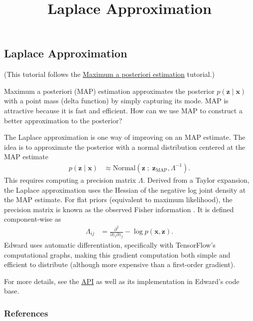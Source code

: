 \title{Laplace Approximation}

\subsection{Laplace Approximation}

(This tutorial follows the
\href{/tutorials/map}{Maximum a posteriori estimation} tutorial.)

Maximum a posteriori (MAP) estimation approximates the posterior $p(\mathbf{z} \mid \mathbf{x})$
with a point mass (delta function) by simply capturing its mode. MAP is
attractive because it is fast and efficient. How can we use MAP to construct a
better approximation to the posterior?

The Laplace approximation
\citep{laplace1986memoir}
is one way of improving on an MAP estimate. The idea
is to approximate the posterior with a normal distribution centered at the MAP
estimate
\begin{align*}
  p(\mathbf{z} \mid \mathbf{x})
  &\approx
  \text{Normal}(\mathbf{z}\;;\; \mathbf{z}_\text{MAP}, \Lambda^{-1}).
\end{align*}
This requires computing a precision matrix $\Lambda$. Derived from a
Taylor expansion, the Laplace approximation uses the Hessian of the
negative log joint density at the MAP estimate. For flat priors
(equivalent to maximum likelihood), the precision matrix is known
as the observed Fisher information \citep{fisher1925theory}.
It is defined component-wise as
\begin{align*}
  \Lambda_{ij}
  &=
  \frac{\partial^2}{\partial z_i \partial z_j} -\log p(\mathbf{x}, \mathbf{z}).
\end{align*}
Edward uses automatic differentiation, specifically with TensorFlow's
computational graphs, making this gradient computation both simple and
efficient to distribute (although more expensive than a first-order
gradient).

For more details, see the \href{/api/}{API} as well as its
implementation in Edward's code base.

\subsubsection{References}\label{references}
